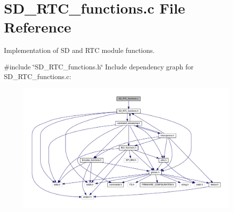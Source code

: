 \section{S\+D\+\_\+\+R\+T\+C\+\_\+functions.\+c File Reference}
\label{_s_d___r_t_c__functions_8c}


Implementation of SD and R\+TC module functions.  


{\ttfamily \#include \char`\"{}S\+D\+\_\+\+R\+T\+C\+\_\+functions.\+h\char`\"{}}\newline
Include dependency graph for S\+D\+\_\+\+R\+T\+C\+\_\+functions.\+c\+:\nopagebreak
\begin{figure}[H]
\begin{center}
\leavevmode
\includegraphics[width=350pt]{_s_d___r_t_c__functions_8c__incl}
\end{center}
\end{figure}
